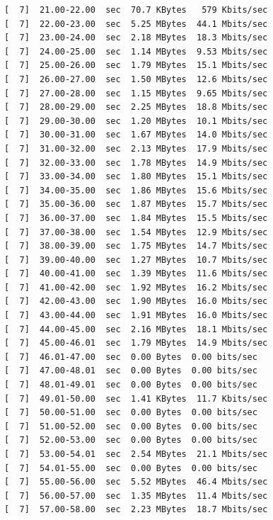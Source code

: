\documentclass[12pt]{article}
\begin{document}
\begin{enumerate}
\begin{latin}
\begin{Verbatim}
[  7]  21.00-22.00  sec  70.7 KBytes   579 Kbits/sec                  
[  7]  22.00-23.00  sec  5.25 MBytes  44.1 Mbits/sec                  
[  7]  23.00-24.00  sec  2.18 MBytes  18.3 Mbits/sec                  
[  7]  24.00-25.00  sec  1.14 MBytes  9.53 Mbits/sec                  
[  7]  25.00-26.00  sec  1.79 MBytes  15.1 Mbits/sec                  
[  7]  26.00-27.00  sec  1.50 MBytes  12.6 Mbits/sec                  
[  7]  27.00-28.00  sec  1.15 MBytes  9.65 Mbits/sec                  
[  7]  28.00-29.00  sec  2.25 MBytes  18.8 Mbits/sec                  
[  7]  29.00-30.00  sec  1.20 MBytes  10.1 Mbits/sec                  
[  7]  30.00-31.00  sec  1.67 MBytes  14.0 Mbits/sec                  
[  7]  31.00-32.00  sec  2.13 MBytes  17.9 Mbits/sec                  
[  7]  32.00-33.00  sec  1.78 MBytes  14.9 Mbits/sec                  
[  7]  33.00-34.00  sec  1.80 MBytes  15.1 Mbits/sec                  
[  7]  34.00-35.00  sec  1.86 MBytes  15.6 Mbits/sec                  
[  7]  35.00-36.00  sec  1.87 MBytes  15.7 Mbits/sec                  
[  7]  36.00-37.00  sec  1.84 MBytes  15.5 Mbits/sec                  
[  7]  37.00-38.00  sec  1.54 MBytes  12.9 Mbits/sec                  
[  7]  38.00-39.00  sec  1.75 MBytes  14.7 Mbits/sec                  
[  7]  39.00-40.00  sec  1.27 MBytes  10.7 Mbits/sec                  
[  7]  40.00-41.00  sec  1.39 MBytes  11.6 Mbits/sec                  
[  7]  41.00-42.00  sec  1.92 MBytes  16.2 Mbits/sec                  
[  7]  42.00-43.00  sec  1.90 MBytes  16.0 Mbits/sec                  
[  7]  43.00-44.00  sec  1.91 MBytes  16.0 Mbits/sec                  
[  7]  44.00-45.00  sec  2.16 MBytes  18.1 Mbits/sec                  
[  7]  45.00-46.01  sec  1.79 MBytes  14.9 Mbits/sec                  
[  7]  46.01-47.00  sec  0.00 Bytes  0.00 bits/sec                  
[  7]  47.00-48.01  sec  0.00 Bytes  0.00 bits/sec                  
[  7]  48.01-49.01  sec  0.00 Bytes  0.00 bits/sec                  
[  7]  49.01-50.00  sec  1.41 KBytes  11.7 Kbits/sec                  
[  7]  50.00-51.00  sec  0.00 Bytes  0.00 bits/sec                  
[  7]  51.00-52.00  sec  0.00 Bytes  0.00 bits/sec                  
[  7]  52.00-53.00  sec  0.00 Bytes  0.00 bits/sec                  
[  7]  53.00-54.01  sec  2.54 MBytes  21.1 Mbits/sec                  
[  7]  54.01-55.00  sec  0.00 Bytes  0.00 bits/sec                  
[  7]  55.00-56.00  sec  5.52 MBytes  46.4 Mbits/sec                  
[  7]  56.00-57.00  sec  1.35 MBytes  11.4 Mbits/sec                  
[  7]  57.00-58.00  sec  2.23 MBytes  18.7 Mbits/sec                  

\end{Verbatim}
\end{latin}
\end{enumerate}
\end{document}
